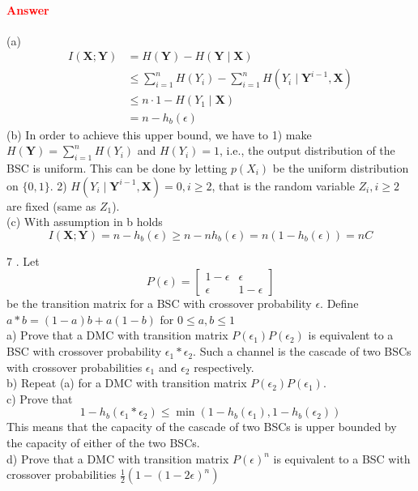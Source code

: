 \documentclass[8pt]{article}
\begin{document}
\paragraph{\textcolor{red}{Answer}}
(a)
$$
\begin{aligned}
	I(\mathbf{X} ; \mathbf{Y}) &=H(\mathbf{Y})-H(\mathbf{Y} \mid \mathbf{X}) \\
	& \leq \sum_{i=1}^{n} H\left(Y_{i}\right)-\sum_{i=1}^{n} H\left(Y_{i} \mid \mathbf{Y}^{i-1}, \mathbf{X}\right)  \\
	& \leq n \cdot 1 - H(Y_1 \mid \mathbf{X})  \\
	& = n-h_{b}(\epsilon)
\end{aligned}
$$
(b) In order to achieve this upper bound, we have to 1) make $H(\mathbf{Y}) = \sum_{i=1}^{n} H\left(Y_{i}\right)$ and $H(Y_i) = 1$, i.e., the output distribution of the BSC is uniform. This can be done by letting $p(X_i)$ be the uniform distribution on $\{0, 1\}$. 2) $H\left(Y_{i} \mid \mathbf{Y}^{i-1}, \mathbf{X}\right) = 0, i \geq 2$, that is the random variable $Z_i, i\geq 2$ are fixed (same as $Z_1$). \\
(c) With assumption in b holds 
$$
I(\mathbf{X} ; \mathbf{Y})  = n-h_{b}(\epsilon) \geq n - n h_{b}(\epsilon) = n(1-h_{b}(\epsilon)) = nC
$$
 

\begin{tcolorbox}
7 . Let
$$
P(\epsilon)=\left[\begin{array}{cc}
	1-\epsilon & \epsilon \\
	\epsilon & 1-\epsilon
\end{array}\right]
$$
be the transition matrix for a BSC with crossover probability $\epsilon .$ Define $a * b=(1-a) b+a(1-b)$ for $0 \leq a, b \leq 1$\\
a) Prove that a DMC with transition matrix $P\left(\epsilon_{1}\right) P\left(\epsilon_{2}\right)$ is equivalent to a BSC with crossover probability $\epsilon_{1} * \epsilon_{2} .$ Such a channel is the cascade of two BSCs with crossover probabilities $\epsilon_{1}$ and $\epsilon_{2}$ respectively.\\
b) Repeat (a) for a DMC with transition matrix $P\left(\epsilon_{2}\right) P\left(\epsilon_{1}\right)$.\\
c) Prove that
$$
1-h_{b}\left(\epsilon_{1} * \epsilon_{2}\right) \leq \min \left(1-h_{b}\left(\epsilon_{1}\right), 1-h_{b}\left(\epsilon_{2}\right)\right)
$$
This means that the capacity of the cascade of two BSCs is upper bounded by the capacity of either of the two BSCs.\\
d) Prove that a DMC with transition matrix $P(\epsilon)^{n}$ is equivalent to a BSC with crossover probabilities $\frac{1}{2}\left(1-(1-2 \epsilon)^{n}\right)$
\end{tcolorbox}
\end{document}
